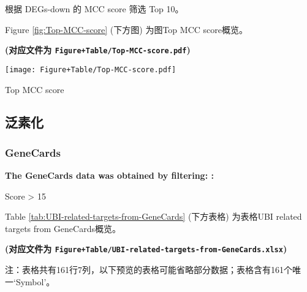 \documentclass[
]{article}
\begin{document}
根据 DEGs-down 的 MCC score 筛选 Top 10。

Figure \ref{fig:Top-MCC-score} (下方图) 为图Top MCC score概览。

\textbf{(对应文件为 \texttt{Figure+Table/Top-MCC-score.pdf})}

\def\@captype{figure}
\begin{center}
\texttt{[image: Figure+Table/Top-MCC-score.pdf]}
\caption{Top MCC score}\label{fig:Top-MCC-score}
\end{center}

\hypertarget{ux6cdbux7d20ux5316}{%
\subsection{泛素化}\label{ux6cdbux7d20ux5316}}

\hypertarget{genecards-1}{%
\subsubsection{GeneCards}\label{genecards-1}}

\begin{center}\begin{tcolorbox}[colback=gray!10, colframe=gray!50, width=0.9\linewidth, arc=1mm, boxrule=0.5pt]
\textbf{
The GeneCards data was obtained by filtering:
:}

\vspace{0.5em}

    Score > 15

\vspace{2em}
\end{tcolorbox}
\end{center}

Table \ref{tab:UBI-related-targets-from-GeneCards} (下方表格) 为表格UBI related targets from GeneCards概览。

\textbf{(对应文件为 \texttt{Figure+Table/UBI-related-targets-from-GeneCards.xlsx})}

\begin{center}\begin{tcolorbox}[colback=gray!10, colframe=gray!50, width=0.9\linewidth, arc=1mm, boxrule=0.5pt]注：表格共有161行7列，以下预览的表格可能省略部分数据；表格含有161个唯一`Symbol'。
\end{tcolorbox}
\end{center}
\end{document}
